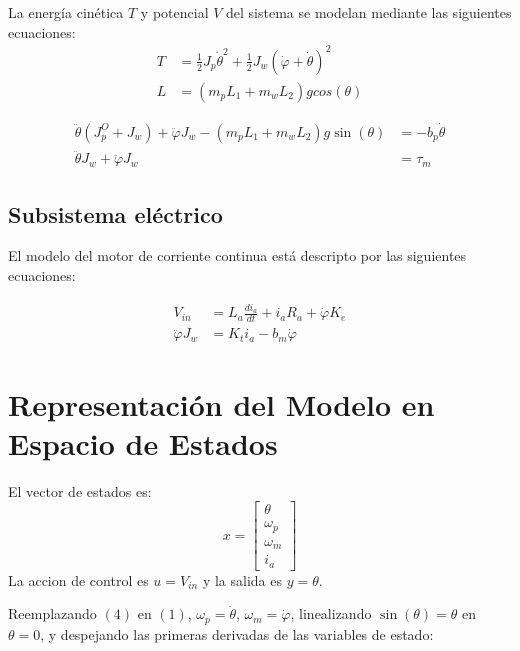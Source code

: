 \documentclass{article}
\begin{document}
        
        La energía cinética $T$ y potencial $V$ del sistema se modelan mediante las siguientes ecuaciones:
        \begin{align*}
            T &= \frac{1}{2} J_p \dot{\theta}^2 + \frac{1}{2} J_w (\dot{\varphi} + \dot{\theta})^2\\
            L &= (m_p L_1 + m_w L_2) g cos(\theta)
        \end{align*}


        \begin{align}
            \ddot{\theta} (J_p^O + J_w) + \ddot{\varphi} J_w - (m_p L_1 + m_w L_2)g \sin(\theta) &= -b_p \dot{\theta}\\
            \ddot{\theta} J_w + \ddot{\varphi} J_w &= \tau_m
        \end{align}

    \subsection{Subsistema eléctrico}
        El modelo del motor de corriente continua está descripto por las siguientes ecuaciones:

        \begin{align}
            V_{in} &= L_a \frac{di_a}{dt} + i_a R_a + \dot{\varphi} K_e\\
            \ddot{\varphi} J_w &= K_t i_a - b_m \dot{\varphi}
        \end{align}

    \section{Representación del Modelo en Espacio de Estados}
    El vector de estados es:
    \begin{equation*}
        x =
        \left[
        \begin{matrix}
            \theta\\
            \omega_p\\
            \omega_m\\
            i_a
        \end{matrix}
        \right]
    \end{equation*}
    La accion de control es 
    $u = V_{in}$ 
    y la salida es 
    $y = \theta$.\newline

    Reemplazando $(4)$ en $(1)$, $\omega_p = \dot{\theta}$, $\omega_m = \dot{\varphi}$, 
    linealizando $\sin(\theta) = \theta$ en $\theta = 0$, 
    y despejando las primeras derivadas de las variables de estado:
    
\end{document}
